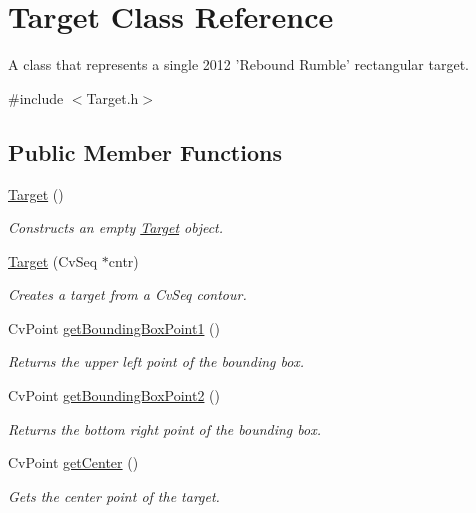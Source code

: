 \hypertarget{classTarget}{
\section{Target Class Reference}
\label{classTarget}
}


A class that represents a single 2012 'Rebound Rumble' rectangular target.  




{\ttfamily \#include $<$Target.h$>$}

\subsection*{Public Member Functions}
\begin{DoxyCompactItemize}
\item 
\hyperlink{classTarget_a7008d6752ce64f82e56aae6ea6c2bb65}{Target} ()
\begin{DoxyCompactList}\small\item\em Constructs an empty \hyperlink{classTarget}{Target} object. \item\end{DoxyCompactList}\item 
\hyperlink{classTarget_a2275921d41d2d55f196ed5b7eb8d2c72}{Target} (CvSeq $\ast$cntr)
\begin{DoxyCompactList}\small\item\em Creates a target from a CvSeq contour. \item\end{DoxyCompactList}\item 
CvPoint \hyperlink{classTarget_a242ea75595d6ecf0aa93cbaff4a86464}{getBoundingBoxPoint1} ()
\begin{DoxyCompactList}\small\item\em Returns the upper left point of the bounding box. \item\end{DoxyCompactList}\item 
CvPoint \hyperlink{classTarget_ac8d03387c639c9acf18c056a8d36bd29}{getBoundingBoxPoint2} ()
\begin{DoxyCompactList}\small\item\em Returns the bottom right point of the bounding box. \item\end{DoxyCompactList}\item 
CvPoint \hyperlink{classTarget_a1746d549afb1a3df93f38bf6e57a1512}{getCenter} ()
\begin{DoxyCompactList}\small\item\em Gets the center point of the target. \item\end{DoxyCompactList}\item 

\end{DoxyCompactItemize}
